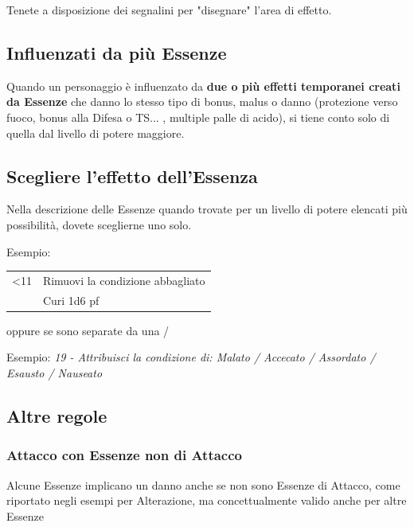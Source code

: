 \documentclass[a4paper,11pt,twoside,openany]{book}
\begin{document}
Tenete a disposizione dei segnalini per "disegnare" l'area di effetto.

\subsection{Influenzati da più Essenze}

\label{influenzati-da-piu-essenze}

Quando un personaggio è influenzato da \textbf{due o più effetti temporanei creati da Essenze} che danno lo stesso tipo di bonus, malus o danno (protezione verso fuoco, bonus alla Difesa o TS... , multiple palle di acido), si tiene conto solo di quella dal livello di potere maggiore.

\subsection{Scegliere l'effetto dell'Essenza}

\label{scegliere-leffetto-dellessenza}

Nella descrizione delle Essenze quando trovate per un livello di potere elencati più possibilità, dovete sceglierne uno solo.

Esempio:

\medskip

\begin{tabularx}{0.95\textwidth}{lX}
	\toprule
	<11 & Rimuovi la condizione abbagliato\\
	    & Curi 1d6 pf
\end{tabularx}

oppure se sono separate da una {/}
 
Esempio: \textit{19 - Attribuisci la condizione di: Malato / Accecato / Assordato / Esausto / Nauseato}

\subsection{Altre regole}

\label{altre-regole}

\subsubsection{Attacco con Essenze non di Attacco}

Alcune Essenze implicano un danno anche se non sono Essenze di Attacco, come riportato negli esempi per Alterazione, ma concettualmente valido anche per altre Essenze
\end{document}
